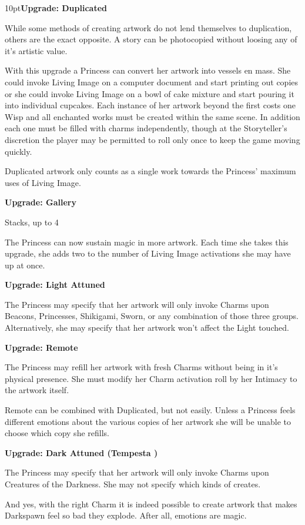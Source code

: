 \begin{myindentpar}{10pt}\textbf{Upgrade: Duplicated}

While some methods of creating artwork do not lend themselves to duplication, others are the exact opposite. A story can be photocopied without loosing any of it's artistic value. 

With this upgrade a Princess can convert her artwork into vessels en mass. She could invoke Living Image on a computer document and start printing out copies or she could invoke Living Image on a bowl of cake mixture and start pouring it into individual cupcakes. Each instance of her artwork beyond the first costs one Wisp and all enchanted works must be created within the same scene. In addition each one must be filled with charms independently, though at the Storyteller's discretion the player may be permitted to roll only once to keep the game moving quickly.

Duplicated artwork only counts as a single work towards the Princess' maximum uses of Living Image.

\textbf{Upgrade: Gallery}

Stacks, up to 4

The Princess can now sustain magic in more artwork. Each time she takes this upgrade, she adds two to the number of Living Image activations she may have up at once.

\textbf{Upgrade: Light Attuned}

The Princess may specify that her artwork will only invoke Charms upon Beacons, Princesses, Shikigami, Sworn, or any combination of those three groups. Alternatively, she may specify that her artwork won't affect the Light touched. 

\textbf{Upgrade: Remote}

The Princess may refill her artwork with fresh Charms without being in it's physical presence. She must modify her Charm activation roll by her Intimacy to the artwork itself. 

Remote can be combined with Duplicated, but not easily. Unless a Princess feels different emotions about the various copies of her artwork she will be unable to choose which copy she refills.

\textbf{Upgrade: Dark Attuned (Tempesta \textbullet)}

The Princess may specify that her artwork will only invoke Charms upon Creatures of the Darkness. She may not specify which kinds of creates. 

And yes, with the right Charm it is indeed possible to create artwork that makes Darkspawn feel so bad they explode. After all, emotions are magic. 
\end{myindentpar}


